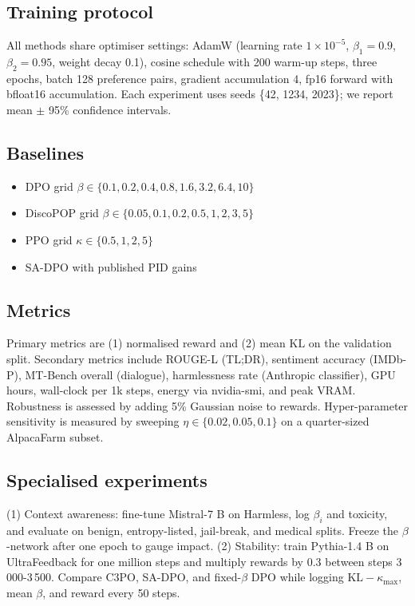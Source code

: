\documentclass{article}
\begin{document}
\subsection{Training protocol}
All methods share optimiser settings: AdamW (learning rate \(1\times 10^{-5}\), \(\beta_{1}=0.9\), \(\beta_{2}=0.95\), weight decay 0.1), cosine schedule with 200 warm-up steps, three epochs, batch 128 preference pairs, gradient accumulation 4, fp16 forward with bfloat16 accumulation. Each experiment uses seeds \{42, 1234, 2023\}; we report mean \(\pm\) 95\% confidence intervals.

\subsection{Baselines}
\begin{itemize}
  \item DPO grid \(\beta \in \{0.1, 0.2, 0.4, 0.8, 1.6, 3.2, 6.4, 10\}\)
  \item DiscoPOP grid \(\beta \in \{0.05, 0.1, 0.2, 0.5, 1, 2, 3, 5\}\)
  \item PPO grid \(\kappa \in \{0.5, 1, 2, 5\}\)
  \item SA-DPO with published PID gains
\end{itemize}

\subsection{Metrics}
Primary metrics are (1) normalised reward and (2) mean \(\mathrm{KL}\) on the validation split. Secondary metrics include ROUGE-L (TL;DR), sentiment accuracy (IMDb-P), MT-Bench overall (dialogue), harmlessness rate (Anthropic classifier), GPU hours, wall-clock per 1k steps, energy via nvidia-smi, and peak VRAM. Robustness is assessed by adding 5\% Gaussian noise to rewards. Hyper-parameter sensitivity is measured by sweeping \(\eta \in \{0.02, 0.05, 0.1\}\) on a quarter-sized AlpacaFarm subset.

\subsection{Specialised experiments}
(1) Context awareness: fine-tune Mistral-7 B on Harmless, log \(\beta_i\) and toxicity, and evaluate on benign, entropy-listed, jail-break, and medical splits. Freeze the \(\beta\)-network after one epoch to gauge impact. (2) Stability: train Pythia-1.4 B on UltraFeedback for one million steps and multiply rewards by \(0.3\) between steps 3\,000-3\,500. Compare C3PO, SA-DPO, and fixed-\(\beta\) DPO while logging \(\mathrm{KL} - \kappa_{\max}\), mean \(\beta\), and reward every 50 steps.
\end{document}
